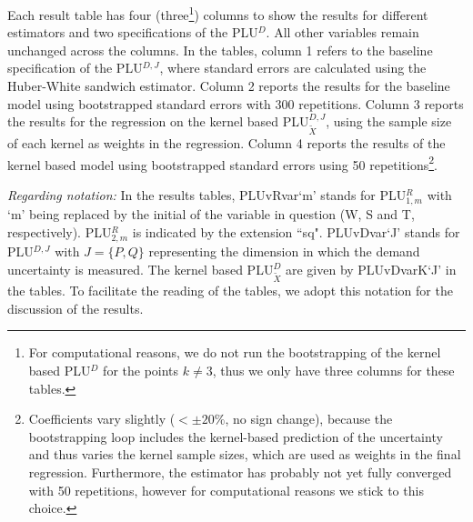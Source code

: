 Each result table has four (three\footnote{For computational reasons, we do not run the bootstrapping of the kernel based PLU$^D$ for the points $k\neq 3$, thus we only have three columns for these tables.}) columns to show the results for different estimators and two specifications of the PLU$^D$. All other variables remain unchanged across the columns. In the tables, column 1 refers to the baseline specification of the PLU$^{D,J}$, where standard errors are calculated using the Huber-White sandwich estimator. Column 2 reports the results for the baseline model using bootstrapped standard errors with 300 repetitions. Column 3 reports the results for the regression on the kernel based PLU$^{D,J}_{\tilde{X}}$, using the sample size of each kernel as weights in the regression. Column 4 reports the results of the kernel based model using bootstrapped standard errors using 50 repetitions\footnote{Coefficients vary slightly ($<\pm20\%$, no sign change), because the bootstrapping loop includes the kernel-based prediction of the uncertainty and thus varies the kernel sample sizes, which are used as weights in the final regression. Furthermore, the estimator has probably not yet fully converged with 50 repetitions, however for computational reasons we stick to this choice.}. 


\emph{Regarding notation:  } In the results tables,
 PLUvRvar`m' stands for PLU$^R_{1,m}$ with `m' being replaced by the initial of the variable in question (W, S and T, respectively). PLU$^R_{2,m}$ is indicated by the extension ``sq".  PLUvDvar`J' stands for PLU$^{D,J}$ with $J=\{P,Q\}$ representing the dimension in which the demand uncertainty is measured.
 The kernel based PLU$^D_{\tilde{X}}$ are given by PLUvDvarK`J' in the tables.
To facilitate the reading of the tables, we adopt this notation for the discussion of the results. 


